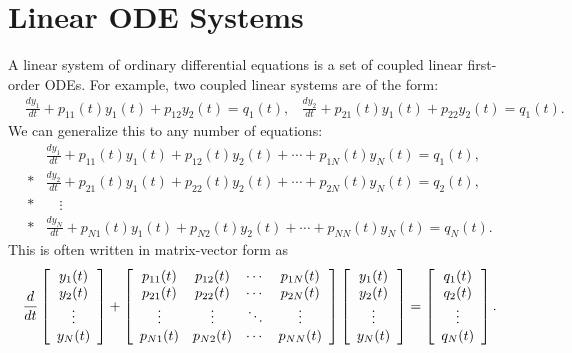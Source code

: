 \section{Linear ODE Systems}

A linear system of ordinary differential equations is a set of coupled linear first-order ODEs. For example, two coupled linear systems are of the form:
\begin{align}
  &\frac{dy_1}{dt} + p_{11}(t) y_1(t) + p_{12} y_2(t) = q_1(t), \nonumber
  &\frac{dy_2}{dt} + p_{21}(t) y_1(t) + p_{22} y_2(t) = q_1(t).
\end{align}
We can generalize this to any number of equations:
\begin{align}
  &\frac{dy_1}{dt} + p_{11}(t) y_1(t) + p_{12}(t) y_2(t) + \cdots + p_{1N}(t) y_N(t) = q_1(t), \nonumber \\*
  &\frac{dy_2}{dt} + p_{21}(t) y_1(t) + p_{22}(t) y_2(t) + \cdots + p_{2N}(t) y_N(t) = q_2(t), \nonumber \\*
  &\quad \vdots \nonumber \\*
  &\frac{dy_N}{dt} + p_{N1}(t) y_1(t) + p_{N2}(t) y_2(t) + \cdots + p_{NN}(t) y_N(t) = q_N(t).
\end{align}
This is often written in matrix-vector form as
\begin{align}
  \frac{d}{dt} \left[ \begin{array}{c} y_1(t) \\ y_2(t) \\ \vdots \\ y_N(t) \\ \end{array} \right]
  + \left[ \begin{array}{c c c c}
  p_{11}(t) & p_{12}(t) & \cdots & p_{1N}(t) \\
  p_{21}(t) & p_{22}(t) & \cdots & p_{2N}(t) \\
  \vdots    & \vdots    & \ddots & \vdots    \\
  p_{N1}(t) & p_{N2}(t) & \cdots & p_{NN}(t) \\ \end{array} \right] 
  \left[ \begin{array}{c} y_1(t) \\ y_2(t) \\ \vdots \\ y_N(t) \\ \end{array} \right] =
  \left[ \begin{array}{c} q_1(t) \\ q_2(t) \\ \vdots \\ q_N(t) \\ \end{array} \right] .
\end{align}

